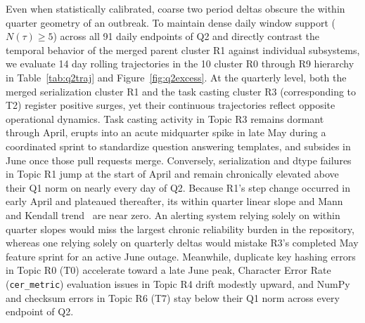 \documentclass[sigconf,anonymous,pbalance]{acmart}
\begin{document}
Even when statistically calibrated, coarse two period deltas obscure the within quarter geometry of an outbreak. To maintain dense daily window support ($N(\tau) \ge 5$) across all 91 daily endpoints of Q2 and directly contrast the temporal behavior of the merged parent cluster R1 against individual subsystems, we evaluate 14 day rolling trajectories in the 10 cluster R0 through R9 hierarchy in Table~\ref{tab:q2traj} and Figure~\ref{fig:q2excess}. At the quarterly level, both the merged serialization cluster R1 and the task casting cluster R3 (corresponding to T2) register positive surges, yet their continuous trajectories reflect opposite operational dynamics. Task casting activity in Topic R3 remains dormant through April, erupts into an acute midquarter spike in late May during a coordinated sprint to standardize question answering templates, and subsides in June once those pull requests merge. Conversely, serialization and dtype failures in Topic R1 jump at the start of April and remain chronically elevated above their Q1 norm on nearly every day of Q2. Because R1's step change occurred in early April and plateaued thereafter, its within quarter linear slope and Mann and Kendall trend~\cite{mann1945nonparametric, kendall1948rank} are near zero. An alerting system relying solely on within quarter slopes would miss the largest chronic reliability burden in the repository, whereas one relying solely on quarterly deltas would mistake R3's completed May feature sprint for an active June outage. Meanwhile, duplicate key hashing errors in Topic R0 (T0) accelerate toward a late June peak, Character Error Rate (\texttt{cer\_metric}) evaluation issues in Topic R4 drift modestly upward, and NumPy and checksum errors in Topic R6 (T7) stay below their Q1 norm across every endpoint of Q2.
\end{document}
